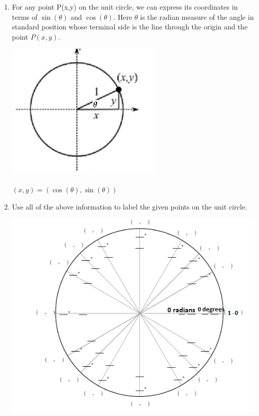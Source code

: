 \documentclass[nooutcomes]{ximera}
\begin{document}
\begin{problem}
\begin{enumerate}
	\item 
For any point P(x,y) on the unit circle, we can express its coordinates in terms of $\sin(\theta)$ and $\cos(\theta)$.
Here $\theta$ is the radian measure of the angle in standard position whose terminal side is the line through the origin and the point $P(x,y)$.
\begin{image}
		\includegraphics[scale=.8]{figure12.png}
		\end{image}
		\begin{freeResponse}
	$(x,y)=(\cos(\theta),\sin(\theta))$
	\end{freeResponse}

	\item  Use all of the above information to label the given points on the unit circle.
		\begin{image}
		\includegraphics{figure6.png}
		\end{image}


\end{enumerate}
\end{problem}
\end{document}
